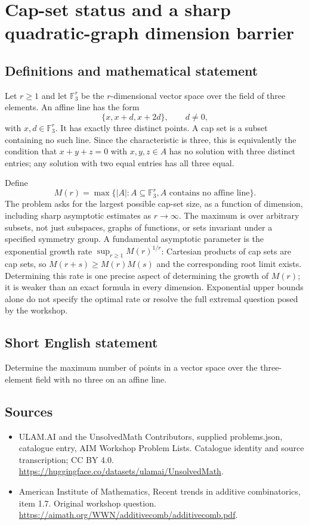 \documentclass[11pt,a4paper]{article}
\begin{document}
\section*{Cap-set status and a sharp quadratic-graph dimension barrier}\label{statement}

\subsection{Definitions and mathematical statement}
Let $r\ge1$ and let $\mathbb F_3^r$ be the $r$-dimensional vector
space over the field of three elements. An affine line has the form
\[
                         \{x,x+d,x+2d\},\qquad d\ne0,
\]
with $x,d\in\mathbb F_3^r$. It has exactly three distinct points.
A cap set is a subset containing no such line. Since the
characteristic is three, this is equivalently the condition that
$x+y+z=0$ with $x,y,z\in A$ has no solution with three distinct
entries; any solution with two equal entries has all three equal.

Define
\[
 M(r)=\max\{|A|:A\subseteq\mathbb F_3^r,
                               A\text{ contains no affine line}\}.
\]
The problem asks for the largest possible cap-set size, as a function
of dimension, including sharp asymptotic estimates as $r\to\infty$.
The maximum is over arbitrary subsets, not just subspaces, graphs
of functions, or sets invariant under a specified symmetry group.
A fundamental asymptotic parameter is the exponential growth rate
$\sup_{r\ge1}M(r)^{1/r}$: Cartesian products of cap sets are cap
sets, so $M(r+s)\ge M(r)M(s)$ and the corresponding root limit
exists. Determining this rate is one precise aspect of determining
the growth of $M(r)$; it is weaker than an exact formula in every
dimension. Exponential upper bounds alone do not specify the optimal
rate or resolve the full extremal question posed by the workshop.
\subsection{Short English statement}
Determine the maximum number of points in a vector space over the three-element field with no three on an affine line.
\subsection{Sources}
\begin{itemize}
\item[S1] ULAM.AI and the UnsolvedMath Contributors, supplied problems.json, catalogue entry, AIM Workshop Problem Lists. Catalogue identity and source transcription; CC BY 4.0.
\url{https://huggingface.co/datasets/ulamai/UnsolvedMath}.
\item[S2] American Institute of Mathematics, Recent trends in additive combinatorics, item 1.7. Original workshop question.
\url{https://aimath.org/WWN/additivecomb/additivecomb.pdf}.
\end{itemize}
\end{document}
